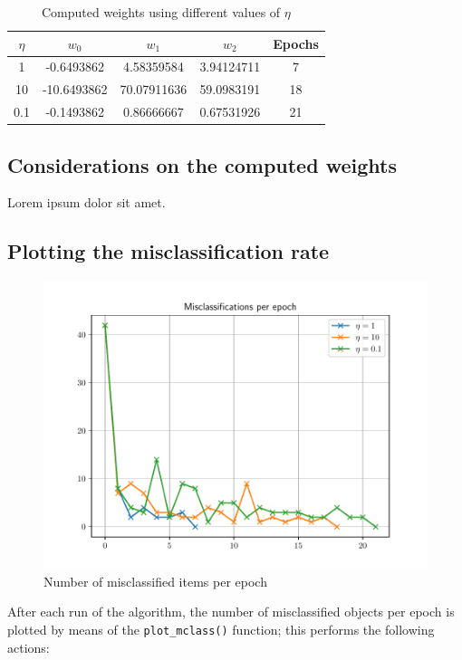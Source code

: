 \documentclass[letterpaper,headings=standardclasses]{scrartcl}
\begin{document}
\begin{table}[h]
\centering
\begin{tabular}{|c|c|c|c|c|}
\hline
$\eta$ & $w_0$       & $w_1$       & $w_2$      & Epochs \\ \hline
1      & -0.6493862  & 4.58359584  & 3.94124711 & 7      \\ \hline
10     & -10.6493862 & 70.07911636 & 59.0983191 & 18     \\ \hline
0.1    & -0.1493862  & 0.86666667  & 0.67531926 & 21     \\ \hline
\end{tabular}
\caption{Computed weights using different values of $\eta$}
\end{table}

\subsection{Considerations on the computed weights}

Lorem ipsum dolor sit amet.

\subsection{Plotting the misclassification rate}

\begin{figure}[h]
\centering
\includegraphics[width=.7\linewidth]{mclass_per_epoch.pdf}
\caption{Number of misclassified items per epoch}
\label{mclass_per_epoch}
\end{figure}

After each run of the algorithm, the number of misclassified objects per epoch is plotted by means of the \texttt{plot\_mclass()} function; this performs the following actions:
\end{document}
